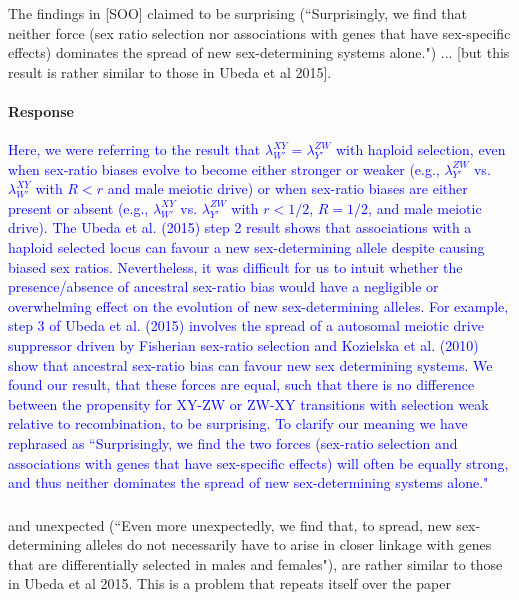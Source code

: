 \documentclass[10pt,letterpaper]{article}
\begin{document}
\noindent\subsubsection{}
The findings in [SOO] claimed to be surprising (``Surprisingly, we find that neither force (sex ratio selection nor associations with genes that have sex-specific effects) dominates the spread of new sex-determining systems alone.") ... [but this result is rather similar to those in Ubeda et al 2015]. 

\noindent\paragraph{Response}
\textcolor{blue}{Here, we were referring to the result that $\lambda_{W'}^{XY} = \lambda_{Y'}^{ZW}$ with haploid selection, even when sex-ratio biases evolve to become either stronger or weaker (e.g., $\lambda_{Y'}^{ZW}$ vs. $\lambda_{W'}^{XY}$ with $R<r$ and male meiotic drive) or when sex-ratio biases are either present or absent (e.g., $\lambda_{W'}^{XY}$ vs. $\lambda_{Y'}^{ZW}$ with $r<1/2$, $R=1/2$, and male meiotic drive). The Ubeda et al. (2015) step 2 result shows that associations with a haploid selected locus can favour a new sex-determining allele despite causing biased sex ratios. Nevertheless, it was difficult for us to intuit whether the presence/absence of ancestral sex-ratio bias would have a negligible or overwhelming effect on the evolution of new sex-determining alleles. For example, step 3 of Ubeda et al. (2015) involves the spread of a autosomal meiotic drive suppressor driven by Fisherian sex-ratio selection and Kozielska et al. (2010) show that ancestral sex-ratio bias can favour new sex determining systems. We found our result, that these forces are equal, such that there is no difference between the propensity for XY-ZW or ZW-XY transitions with selection weak relative to recombination, to be surprising.} \textcolor{blue}{To clarify our meaning we have rephrased as ``Surprisingly, we find the two forces (sex-ratio selection and associations with genes that have sex-specific effects) will often be equally strong, and thus neither dominates the spread of new sex-determining systems alone."}

\noindent\subsubsection{}
\noindent and unexpected (``Even more unexpectedly, we find that, to spread, new sex-determining alleles do not necessarily have to arise in closer linkage with genes that are differentially selected in males and females"), are rather similar to those in Ubeda et al 2015. This is a problem that repeats itself over the paper 
\end{document}
